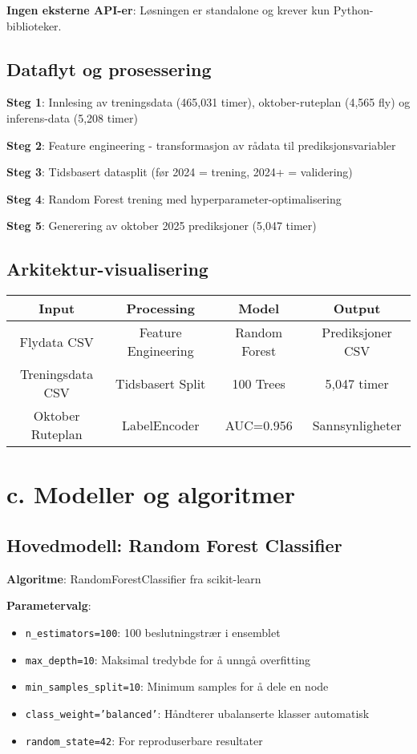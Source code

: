 \documentclass[11pt,a4paper]{article}
\begin{document}
\textbf{Ingen eksterne API-er}: Løsningen er standalone og krever kun Python-biblioteker.

\subsection{Dataflyt og prosessering}

\textbf{Steg 1}: Innlesing av treningsdata (465,031 timer), oktober-ruteplan (4,565 fly) og inferens-data (5,208 timer)

\textbf{Steg 2}: Feature engineering - transformasjon av rådata til prediksjonsvariabler

\textbf{Steg 3}: Tidsbasert datasplit (før 2024 = trening, 2024+ = validering)

\textbf{Steg 4}: Random Forest trening med hyperparameter-optimalisering

\textbf{Steg 5}: Generering av oktober 2025 prediksjoner (5,047 timer)

\subsection{Arkitektur-visualisering}
\begin{center}
\begin{tabular}{|c|c|c|c|}
\hline
\textbf{Input} & \textbf{Processing} & \textbf{Model} & \textbf{Output} \\
\hline
Flydata CSV & Feature Engineering & Random Forest & Prediksjoner CSV \\
Treningsdata CSV & Tidsbasert Split & 100 Trees & 5,047 timer \\
Oktober Ruteplan & LabelEncoder & AUC=0.956 & Sannsynligheter \\
\hline
\end{tabular}
\end{center}

\section{c. Modeller og algoritmer}

\subsection{Hovedmodell: Random Forest Classifier}

\textbf{Algoritme}: RandomForestClassifier fra scikit-learn

\textbf{Parametervalg}:
\begin{itemize}
    \item \texttt{n\_estimators=100}: 100 beslutningstrær i ensemblet
    \item \texttt{max\_depth=10}: Maksimal tredybde for å unngå overfitting
    \item \texttt{min\_samples\_split=10}: Minimum samples for å dele en node
    \item \texttt{class\_weight='balanced'}: Håndterer ubalanserte klasser automatisk
    \item \texttt{random\_state=42}: For reproduserbare resultater
\end{itemize}
\end{document}
